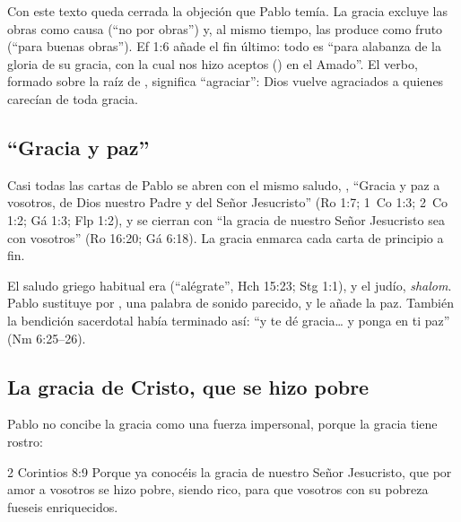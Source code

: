 Con este texto queda cerrada la objeción que Pablo temía. La gracia excluye las obras como causa (``no por obras'') y, al mismo tiempo, las produce como fruto (``para buenas obras''). Ef 1:6 añade el fin último: todo es ``para alabanza de la gloria de su gracia, con la cual nos hizo aceptos () en el Amado''. El verbo, formado sobre la raíz de , significa ``agraciar'': Dios vuelve agraciados a quienes carecían de toda gracia.


\subsection{“Gracia y paz”}\label{sec:gracia-paz}
Casi todas las cartas de Pablo se abren con el mismo saludo, , ``Gracia y paz a vosotros, de Dios nuestro Padre y del Señor Jesucristo'' (Ro 1:7; 1~Co 1:3; 2~Co 1:2; Gá 1:3; Flp 1:2), y se cierran con ``la gracia de nuestro Señor Jesucristo sea con vosotros'' (Ro 16:20; Gá 6:18). La gracia enmarca cada carta de principio a fin.

El saludo griego habitual era  (``alégrate'', Hch 15:23; Stg 1:1), y el judío, \emph{shalom}. Pablo sustituye  por , una palabra de sonido parecido, y le añade la paz. También la bendición sacerdotal había terminado así: ``y te dé gracia\ldots{} y ponga en ti paz'' (Nm 6:25--26).


\subsection{La gracia de Cristo, que se hizo pobre}
Pablo no concibe la gracia como una fuerza impersonal, porque la gracia tiene rostro:

\begin{verso}{2 Corintios 8:9}
Porque ya conocéis la gracia de nuestro Señor Jesucristo, que por amor a vosotros se hizo pobre, siendo rico, para que vosotros con su pobreza fueseis enriquecidos.
\end{verso}

